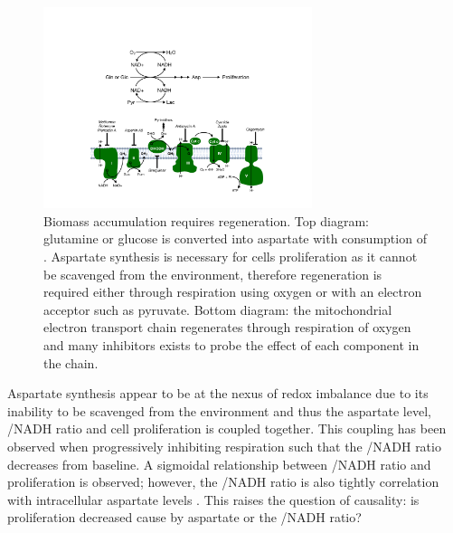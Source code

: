\begin{figure}
    \centering
    \includegraphics[width=0.70\textwidth]{figures/chap1/redox_biomass.pdf}
    \caption[Biomass accumulation requires \NAD{} regeneration]{
    Biomass accumulation requires \NAD{} regeneration.
    Top diagram: glutamine or glucose is converted into aspartate with consumption of \NAD.
    Aspartate synthesis is necessary for cells proliferation as it cannot be scavenged from the environment, therefore \NAD{} regeneration is required either through respiration using oxygen or with an electron acceptor such as pyruvate.
    Bottom diagram: the mitochondrial electron transport chain regenerates \NAD{} through respiration of oxygen and many inhibitors exists to probe the effect of each component in the chain.
    }
    \label{fig:ch1:redox_biomass}
\end{figure}


Aspartate synthesis appear to be at the nexus of redox imbalance due to its inability to be scavenged from the environment and thus the aspartate level, \NAD/NADH ratio and cell proliferation is coupled together.
This coupling has been observed when progressively inhibiting respiration such that the \NAD/NADH ratio decreases from baseline.
A sigmoidal relationship between \NAD/NADH ratio and proliferation is observed; however, the \NAD/NADH ratio is also tightly correlation with intracellular aspartate levels \cite{Gui2016-ca}.
This raises the question of causality: is proliferation decreased cause by aspartate or the \NAD/NADH ratio?

